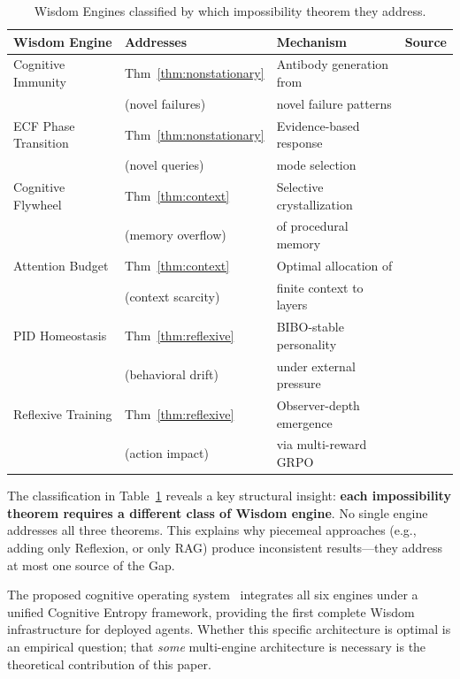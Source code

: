 \documentclass{article}
\begin{document}
\begin{table}[h]
\centering
\caption{Wisdom Engines classified by which impossibility theorem they address.}
\label{tab:engines}
\begin{tabular}{@{}llll@{}}
\toprule
\textbf{Wisdom Engine} & \textbf{Addresses} & \textbf{Mechanism} & \textbf{Source} \\
\midrule
Cognitive Immunity & Thm~\ref{thm:nonstationary} & Antibody generation from & \cite{anon_immunity} \\
& (novel failures) & novel failure patterns & \\
\addlinespace
ECF Phase Transition & Thm~\ref{thm:nonstationary} & Evidence-based response & \cite{anon_system} \\
& (novel queries) & mode selection & \\
\addlinespace
Cognitive Flywheel & Thm~\ref{thm:context} & Selective crystallization & \cite{anon_system} \\
& (memory overflow) & of procedural memory & \\
\addlinespace
Attention Budget & Thm~\ref{thm:context} & Optimal allocation of & \cite{anon_system} \\
& (context scarcity) & finite context to layers & \\
\addlinespace
PID Homeostasis & Thm~\ref{thm:reflexive} & BIBO-stable personality & \cite{anon_system} \\
& (behavioral drift) & under external pressure & \\
\addlinespace
Reflexive Training & Thm~\ref{thm:reflexive} & Observer-depth emergence & \cite{reflexive_intelligence} \\
& (action impact) & via multi-reward GRPO & \\
\bottomrule
\end{tabular}
\end{table}

The classification in Table~\ref{tab:engines} reveals a key structural
insight: \textbf{each impossibility theorem requires a different class
of Wisdom engine}. No single engine addresses all three theorems. This
explains why piecemeal approaches (e.g., adding only Reflexion, or only
RAG) produce inconsistent results---they address at most one source of
the Gap.

The proposed cognitive operating system~\cite{anon_system}
integrates all six engines under a unified Cognitive Entropy framework,
providing the first complete Wisdom infrastructure for deployed agents.
Whether this specific architecture is optimal is an empirical question;
that \emph{some} multi-engine architecture is necessary is the theoretical
contribution of this paper.
\end{document}
